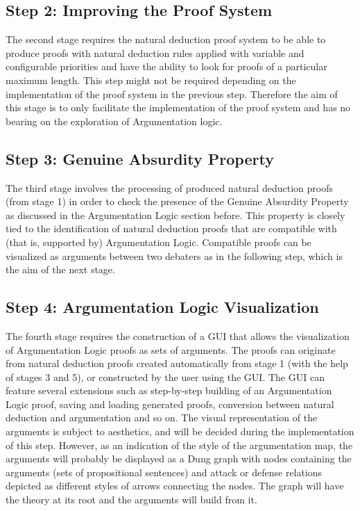 \documentclass[11pt,twoside,a4paper]{report}
\begin{document}
\subsection{Step 2: Improving the Proof System}
The second stage requires the natural deduction proof system to be able to produce proofs with natural deduction rules applied with variable and configurable priorities and have the ability to look for proofs of a particular maximum length. This step might not be required depending on the implementation of the proof system in the previous step. Therefore the aim of this stage is to only facilitate the implementation of the proof system and has no bearing on the exploration of Argumentation logic.

\subsection{Step 3: Genuine Absurdity Property}
The third stage involves the processing of produced natural deduction proofs (from stage 1) in order to check the presence of the Genuine Absurdity Property as discussed in the Argumentation Logic section before. This property is closely tied to the identification of natural deduction proofs that are compatible with (that is, supported by) Argumentation Logic. Compatible proofs can be visualized as arguments between two debaters as in the following step, which is the aim of the next stage.

\subsection{Step 4: Argumentation Logic Visualization}
The fourth stage requires the construction of a GUI that allows the visualization of Argumentation Logic proofs as sets of arguments. The proofs can originate from natural deduction proofs created automatically from stage 1 (with the help of stages 3 and 5), or constructed by the user using the GUI. The GUI can feature several extensions such as step-by-step building of an Argumentation Logic proof, saving and loading generated proofs, conversion between natural deduction and argumentation and so on. The visual representation of the arguments is subject to aesthetics, and will be decided during the implementation of this step. However, as an indication of the style of the argumentation map, the arguments will probably be displayed as a Dung graph with nodes containing the arguments (sets of propositional sentences) and attack or defense relations depicted as different styles of arrows connecting the nodes. The graph will have the theory at its root and the arguments will build from it. 
\end{document}
